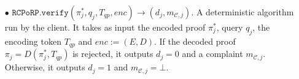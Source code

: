 \begin{definition}
\begin{itemize}



\

\item[$\bullet$] $\mathtt{RCPoRP}.\mathtt{verify}(\pi^{\scriptscriptstyle *}_{\scriptscriptstyle j}, {q}_{\scriptscriptstyle j},T_{\scriptscriptstyle qp},enc)\rightarrow (d_{\scriptscriptstyle j},m_{\scriptscriptstyle \mathcal{C},j})$. A deterministic algorithm run by the client. It takes as input the encoded proof $\pi^{\scriptscriptstyle *}_{\scriptscriptstyle j}$,  query  ${q}_{\scriptscriptstyle j}$,   the encoding token $T_{\scriptscriptstyle qp}$ and $enc:=(E,D)$. If the decoded proof $\pi_{\scriptscriptstyle j}=D(\pi^{\scriptscriptstyle *}_{\scriptscriptstyle j},T_{\scriptscriptstyle qp})$ is rejected,  it outputs $d_{\scriptscriptstyle j}=0$ and a complaint $m_{\scriptscriptstyle \mathcal{C},j}$. Otherwise, it outputs  $d_{\scriptscriptstyle j}=1$ and $m_{\scriptscriptstyle \mathcal{C},j}=\bot$.





\end{itemize}
\end{definition}

